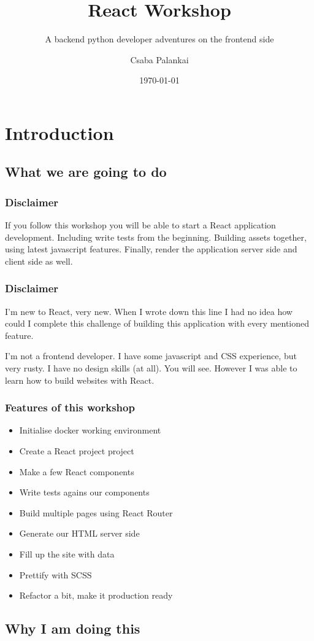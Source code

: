 \documentclass{beamer}
\title{React Workshop}
\author{Csaba Palankai}
\subtitle{A backend python developer adventures on the frontend side}
\date{\today}
\begin{document}
\frame{\titlepage}

\section{Introduction}

\subsection{What we are going to do}


\frame
{
  \frametitle{Disclaimer}
  If you follow this workshop you will be able to start
  a React application development. 
  \pause
  Including write tests from the beginning.
  \pause
  Building assets together, using latest javascript features.
  \pause
  Finally, render the application server side and client side as well.
}

\frame
{
  \frametitle{Disclaimer}
  I'm new to React, very new.
  \pause
  When I wrote down this line I had no idea how could I
  complete this challenge of building this application with every mentioned feature.
  \pause
  
  
  I'm not a frontend developer. I have some javascript and CSS experience, but very rusty.
  \pause
  I have no design skills
  \pause
  (at all).
  \pause
  You will see.
  \pause
  However I was able to learn how to build websites with React.
  \pause
}

\frame
{
  \frametitle{Features of this workshop}

  \begin{itemize}
  \item<1-> Initialise docker working environment
  \item<2-> Create a React project project
  \item<3-> Make a few React components
  \item<4-> Write tests agains our components
  \item<5-> Build multiple pages using React Router
  \item<6-> Generate our HTML server side
  \item<7-> Fill up the site with data
  \item<8-> Prettify with SCSS
  \item<9-> Refactor a bit, make it production ready
  \end{itemize}
}

\subsection{Why I am doing this}
\end{document}
